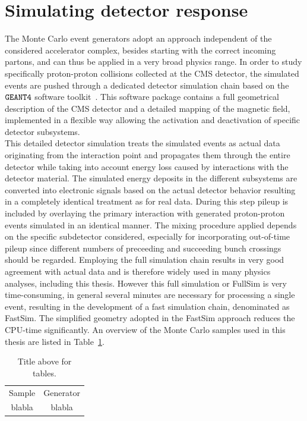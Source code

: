 \section{Simulating detector response} \label{sec::DetectorSim} %
The Monte Carlo event generators adopt an approach independent of the considered accelerator complex, besides starting with the correct incoming partons, and can thus be applied in a very broad physics range. In order to study specifically proton-proton collisions collected at the CMS detector, the simulated events are pushed through a dedicated detector simulation chain based on the $\texttt{GEANT4}$ software toolkit~\cite{}. This software package contains a full geometrical description of the CMS detector and a detailed mapping of the magnetic field, implemented in a flexible way allowing the activation and deactivation of specific detector subsystems.
\\
This detailed detector simulation treats the simulated events as actual data originating from the interaction point and propagates them through the entire detector while taking into account energy loss caused by interactions with the detector material. 
The simulated energy deposits in the different subsystems are converted into electronic signals based on the actual detector behavior resulting in a completely identical treatment as for real data.
During this step pileup is included by overlaying the primary interaction with generated proton-proton events simulated in an identical manner. 
The mixing procedure applied depends on the specific subdetector considered, especially for incorporating out-of-time pileup since different numbers of preceeding and succeeding bunch crossings should be regarded.
Employing the full simulation chain results in very good agreement with actual data and is therefore widely used in many physics analyses, including this thesis. However this full simulation or FullSim is very time-consuming, in general several minutes are necessary for processing a single event, resulting in the development of a fast simulation chain, denominated as FastSim. 
The simplified geometry adopted in the FastSim approach reduces the CPU-time significantly. %
An overview of the Monte Carlo samples used in this thesis are listed in Table~\ref{table::Samples}.

\begin{table}[h!t]
 \caption{Title above for tables.} \label{table::Samples}
 \centering
 \begin{tabular}{|c|c|}
  \hline
  Sample & Generator \\
  blabla & blabla \\
  \hline
 \end{tabular}
\end{table}

